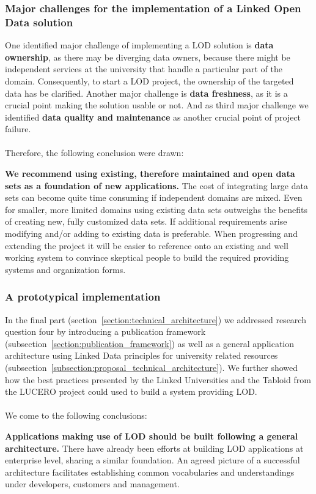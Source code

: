 \subsubsection{Major challenges for the implementation of a Linked Open Data solution}
One identified major challenge of implementing a LOD solution is \textbf{data ownership}, as there may be diverging data owners, because there might be independent services at the university that handle a particular part of the domain. Consequently, to start a LOD project, the ownership of the targeted data has be clarified. Another major challenge is \textbf{data freshness}, as it is a crucial point making the solution usable or not. And as third major challenge we identified \textbf{data quality and maintenance} as another crucial point of project failure.
\\~\\
Therefore, the following conclusion were drawn:

\textbf{We recommend using existing, therefore maintained and open data sets as a foundation of new applications.} The cost of integrating large data sets can become quite time consuming if independent domains are mixed. Even for smaller, more limited domains using existing data sets outweighs the benefits of creating new, fully customized data sets. If additional requirements arise
modifying and/or adding to existing data is preferable. When progressing and extending the project it will be easier to reference onto an existing and well working system to convince skeptical people to build the required providing systems and organization forms.

\subsubsection{A prototypical implementation}
In the final part (section~\ref{section:technical_architecture}) we addressed research question four by introducing a publication framework (subsection~\ref{section:publication_framework}) as well as a general application architecture using Linked Data principles for university related resources (subsection~\ref{subsection:proposal_technical_architecture}). We further showed how the best practices presented by the Linked Universities and the Tabloid from the LUCERO project could used to build a system providing LOD.
\\~\\
We come to the following conclusions:

\textbf{Applications making use of LOD should be built following a general architecture.} There have already been efforts at building LOD applications at enterprise level, sharing a similar foundation. An agreed picture of a successful architecture facilitates establishing common vocabularies and understandings under developers, customers and management.

